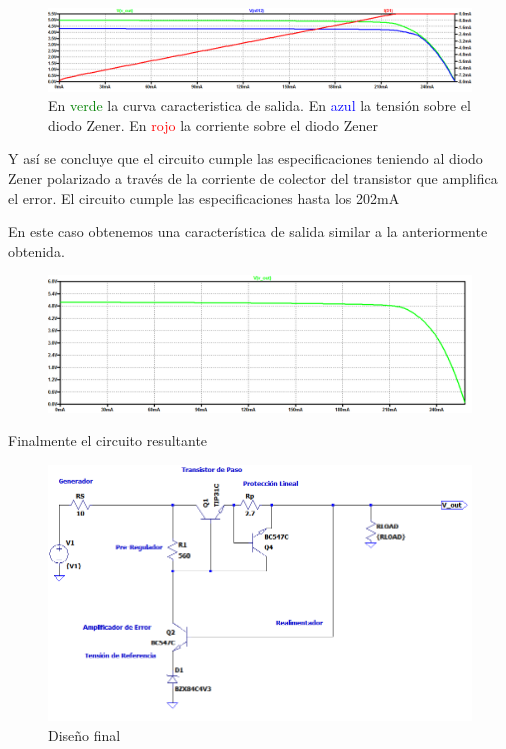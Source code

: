 \begin{figure}[H]
	\centering
	\includegraphics[width=\linewidth]{ImagenesEjercicio1/SinRpz3curvas}
	\caption{En \textcolor{green}{verde} la curva caracteristica de salida. En \textcolor{blue}{azul} la tensión sobre el diodo Zener. En \textcolor{red}{rojo} la corriente sobre el diodo Zener}
	\label{fig:sinrpz3curvas}
\end{figure}

Y así se concluye que el circuito cumple las especificaciones teniendo al diodo Zener polarizado a través
de la corriente de colector del transistor que amplifica el error.
El circuito cumple las especificaciones hasta los 202mA

En este caso obtenemos una característica de salida similar a la anteriormente obtenida.
\begin{figure}[H]
	\centering
	\includegraphics[width=\linewidth]{ImagenesEjercicio1/CaracteristicaDeSalidaConGrillaFL}
	\caption{}
	\label{fig:caracteristicadesalidacongrillafl}
\end{figure} 
Finalmente el circuito resultante
\begin{figure}[H]
	\centering
	\includegraphics[width=0.7\linewidth]{ImagenesEjercicio1/ImagenCircuitoFL}
	\caption{Diseño final}
	\label{fig:imagencircuitofl}
\end{figure}



